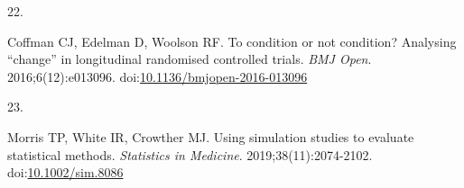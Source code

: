 \documentclass[
  11pt,
]{article}
\newlength{\cslhangindent}
\newlength{\csllabelwidth}
\newenvironment{CSLReferences}[2] %
 {\begin{list}{}{%
  \setlength{\itemindent}{0pt}
  \setlength{\leftmargin}{0pt}
  \setlength{\parsep}{0pt}
  \ifodd #1
   \setlength{\leftmargin}{\cslhangindent}
   \setlength{\itemindent}{-1\cslhangindent}
  \fi
  \setlength{\itemsep}{#2\baselineskip}}}
 {\end{list}}
\newcommand{\CSLLeftMargin}[1]{\parbox[t]{\csllabelwidth}{\strut#1\strut}}
\newcommand{\CSLRightInline}[1]{\parbox[t]{\linewidth - \csllabelwidth}{\strut#1\strut}}
\begin{document}
\begin{CSLReferences}{0}{1}
\CSLLeftMargin{22. }%
\CSLRightInline{Coffman CJ, Edelman D, Woolson RF. To condition or not condition? Analysing {``change''} in longitudinal randomised controlled trials. \emph{BMJ Open}. 2016;6(12):e013096. doi:\href{https://doi.org/10.1136/bmjopen-2016-013096}{10.1136/bmjopen-2016-013096}}

\CSLLeftMargin{23. }%
\CSLRightInline{Morris TP, White IR, Crowther MJ. Using simulation studies to evaluate statistical methods. \emph{Statistics in Medicine}. 2019;38(11):2074-2102. doi:\href{https://doi.org/10.1002/sim.8086}{10.1002/sim.8086}}

\end{CSLReferences}
\end{document}
